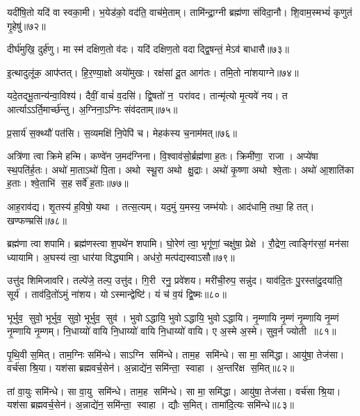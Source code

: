 यदी॑षि॒तो यदि॑ वा स्वका॒मी। 
भ॒येड॑को॒ वद॑ति॒ वाच॑मे॒ताम्। 
तामि॑न्द्रा॒ग्नी ब्रह्म॑णा संविदा॒नौ। 
शि॒वाम॒स्मभ्यं॑ कृणुतं गृ॒हेषु॑॥७२॥
\anuvakamend

दीर्घ॑मुखि॒ दुर्\mbox{}ह॑णु। 
मा स्म॑ दक्षिण॒तो व॑दः। 
यदि॑ दक्षिण॒तो वदाद्द्वि॒षन्तं॒ मेऽव॑ बाधासै॥७३॥
\anuvakamend

इ॒त्थादुलू॑क॒ आप॑प्तत्। 
हि॒र॒ण्या॒क्षो अयो॑मुखः। 
रक्ष॑सां दू॒त आग॑तः। 
तमि॒तो ना॑शयाग्ने॥७४॥
\anuvakamend


यदे॒तद्भू॒तान्य॑न्वा॒विश्य॑। 
दैवीं॒ वाचं॑ व॒दसि॑। 
द्वि॒षतो॑ न॒ परा॑वद। 
तान्मृ॑त्यो मृ॒त्यवे॑ नय। 
त आर्त्याऽऽर्ति॒मार्च्छ॑न्तु। 
अ॒ग्निना॒ऽग्निः संव॑दताम्॥७५॥
\anuvakamend


प्र॒सार्य॑ स॒क्थ्यौ॑ पत॑सि। 
स॒व्यमक्षि॑ नि॒पेपि॑ च। 
मेहक॑स्य च॒नाम॑मत्॥७६॥
\anuvakamend


अत्रि॑णा त्वा क्रिमे हन्मि। 
कण्वे॑न ज॒मद॑ग्निना। 
वि॒श्वाव॑सो॒र्ब्रह्म॑णा ह॒तः। 
क्रिमी॑णा॒ राजा। 
अप्ये॑षा स्थ॒पति॑र्\mbox{}ह॒तः। 
अथो॑ मा॒ताऽथो॑ पि॒ता। 
अथो स्थू॒रा अथो क्षु॒द्राः। 
अथो॑ कृ॒ष्णा अथो श्वे॒ताः। 
अथो॑ आ॒शाति॑का ह॒ताः। 
श्वे॒ताभि॑ स॒ह सर्वे॑ ह॒ताः॥७७॥
\anuvakamend


आह॒राव॑द्य। 
शृ॒तस्य॑ ह॒विषो॒ यथा। 
तत्स॒त्यम्। 
यद॒मुं य॒मस्य॒ जम्भ॑योः। 
आद॑धामि॒ तथा॒ हि तत्। 
खण्फण्म्रसि॑॥७८॥
\anuvakamend


ब्रह्म॑णा त्वा शपामि। 
ब्रह्म॑णस्त्वा श॒पथे॑न शपामि। 
घो॒रेण॑ त्वा॒ भृगू॑णां॒ चक्षु॑षा॒ प्रेक्षे। 
रौ॒द्रेण॒ त्वाङ्गि॑रसां॒ मन॑सा ध्यायामि। 
अ॒घस्य॑ त्वा॒ धार॑या विद्ध्यामि। 
अध॑रो॒ मत्प॑द्यस्वाऽसौ॥७९॥%
\anuvakamend


उत्तु॑द शिमिजावरि। 
तल्पे॑जे॒ तल्प॒ उत्तु॑द। 
गि॒री रनु॒ प्रवे॑शय। 
मरी॑ची॒रुप॒ सन्नु॑द। 
याव॑दि॒तः पु॒रस्ता॑दु॒दया॑ति॒ सूर्य॑। 
ताव॑दि॒तो॑ऽमुं ना॑शय। 
योऽस्मान्द्वेष्टि॑। 
यं च॑ व॒यं द्वि॒ष्मः॥८०॥
\anuvakamend


भूर्भुव॒ सुवो॒ भूर्भुव॒ सुवो॒ भूर्भुव॒ सुव॑। 
भुवोऽद्धायि॒ भुवोऽद्धायि॒ भुवोऽद्धायि। 
नृ॒म्णायि नृ॒म्णं नृ॒म्णायि नृ॒म्णं नृ॒म्णायि नृ॒म्णम्। 
नि॒धाय्यो॑ वायि नि॒धाय्यो॑ वायि नि॒धाय्यो॑ वायि। 
ए अ॒स्मे अ॒स्मे। 
सुव॒र्न ज्योती॥८१॥
\anuvakamend


पृ॒थि॒वी स॒मित्। 
ताम॒ग्निः समि॑न्धे। 
साऽग्नि समि॑न्धे। 
ताम॒ह समि॑न्धे। 
सा मा॒ समि॑द्धा। 
आयु॑षा॒ तेज॑सा। 
वर्च॑सा श्रि॒या। 
यश॑सा ब्रह्मवर्च॒सेन॑। 
अ॒न्नाद्ये॑न॒ समि॑न्ता॒ स्वाहा। 
अ॒न्तरि॑क्ष स॒मित्॥८२॥

तां वा॒युः समि॑न्धे। 
सा वा॒यु समि॑न्धे। 
ताम॒ह समि॑न्धे। 
सा मा॒ समि॑द्धा। 
आयु॑षा॒ तेज॑सा। 
वर्च॑सा श्रि॒या। 
यश॑सा ब्रह्मवर्च॒सेन॑। 
अ॒न्नाद्ये॑न॒ समि॑न्ता॒ स्वाहा। 
द्यौः स॒मित्। 
तामा॑दि॒त्यः समि॑न्धे॥८३॥

